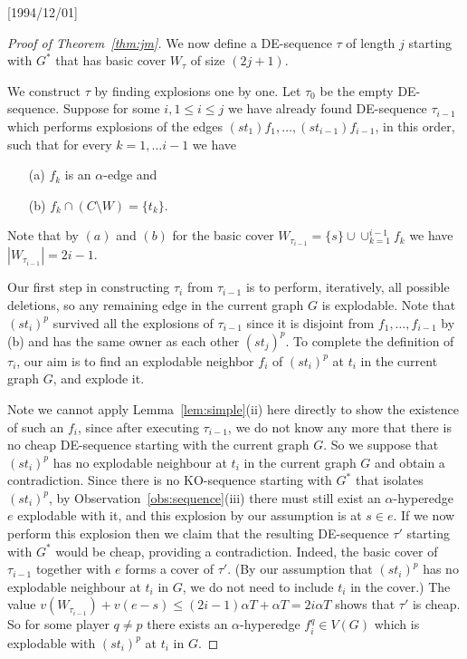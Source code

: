 \NeedsTeXFormat{LaTeX2e}[1994/12/01]\documentclass[letterpaper, 11pt]{article}
\theoremstyle{definition}
\theoremstyle{remark}
\numberwithin{equation}{section}
\begin{document}
\begin{proof}[Proof of Theorem~\ref{thm:jm}]
We now define a DE-sequence $\tau$ of length $j$ starting with $G^*$
that has basic cover $W_{\tau}$ of size $(2j+1)$. 

We construct $\tau$ by finding explosions one by one.
Let $\tau_0$ be the empty DE-sequence.
Suppose for some $i, 1\leq i \leq j$ we have already found DE-sequence
$\tau_{i-1}$ which performs explosions of the edges
$(st_1)f_1, \ldots , (st_{i-1})f_{i-1}$, in this order, such that for every
$k=1, \ldots i -1$ we have 
\begin{itemize}
\item[(a)] $f_k$ is an $\alpha$-edge and
\item[(b)] $f_k\cap (C\setminus W) = \{ t_k\}$.
\end{itemize}
Note that by $(a)$ and $(b)$ for the basic cover $W_{\tau_{i-1}} = \{ s \} \cup
\cup_{k=1}^{i-1} f_k$ we have $|W_{\tau_{i-1}}|  = 2i-1$.


Our first step in constructing $\tau_i$ from $\tau_{i-1}$ is to perform, iteratively,
all possible deletions, so any remaining edge in the current graph
$G$ is explodable.  
Note that $(st_i)^p$ survived all the explosions of $\tau_{i-1}$ since
it is disjoint from $f_1, \ldots , f_{i-1}$ by (b) and has the same
owner as each other $(st_j)^p$.
To complete the definition of $\tau_i$, our aim is to find an
explodable neighbor $f_i$ of $(st_i)^p$ at $t_i$ in the current
graph $G$, and explode it.

Note we cannot apply Lemma~\ref{lem:simple}(ii) here directly to show
the existence of such an $f_i$, since after executing
$\tau_{i-1}$, we do not know any more that there is no cheap
DE-sequence starting with the current graph $G$.   
So we suppose that
$(st_{i})^p$ has no explodable neighbour at $t_i$ in the current graph
$G$ and obtain a contradiction. 
Since there is no KO-sequence starting with $G^*$ that isolates
$(st_i)^p$, by Observation~\ref{obs:sequence}(iii) there must still exist an $\alpha$-hyperedge
$e$ explodable with it, and this explosion by our assumption is at $s\in e$. 
If we now perform this explosion then we claim that the resulting 
DE-sequence $\tau'$ starting with $G^*$ would be cheap, providing a
contradiction. 
Indeed, the basic cover of $\tau_{i-1}$ together with $e$ forms a cover
of $\tau'$.  (By our assumption that $(st_{i})^p$ has no explodable
neighbour at $t_i$ in $G$, we do not need to include $t_i$ in the cover.)
The value $v(W_{\tau_{i-1}})  + v(e-s) \leq  (2i-1)\alpha T +\alpha T = 2i\alpha T$ shows that
$\tau'$ is cheap. So for some player $q \neq p$
there exists an $\alpha$-hyperedge $f_i^q \in V(G)$ which is
  explodable with $(st_i)^p$ at $t_i$ in $G$.


\end{proof}
\end{document}
